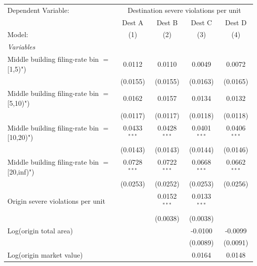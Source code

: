 \begingroup
\centering
\begin{tabular}{lcccc}
   \tabularnewline \midrule \midrule
   Dependent Variable: & \multicolumn{4}{c}{Destination severe violations per unit}\\
                                                  & Dest A         & Dest B         & Dest C         & Dest D \\   
   Model:                                         & (1)            & (2)            & (3)            & (4)\\  
   \midrule
   \emph{Variables}\\
   Middle building filing-rate bin $=$ [1,5)")    & 0.0112         & 0.0110         & 0.0049         & 0.0072\\   
                                                  & (0.0155)       & (0.0155)       & (0.0163)       & (0.0165)\\   
   Middle building filing-rate bin $=$ [5,10)")   & 0.0162         & 0.0157         & 0.0134         & 0.0132\\   
                                                  & (0.0117)       & (0.0117)       & (0.0118)       & (0.0118)\\   
   Middle building filing-rate bin $=$ [10,20)")  & 0.0433$^{***}$ & 0.0428$^{***}$ & 0.0401$^{***}$ & 0.0406$^{***}$\\   
                                                  & (0.0143)       & (0.0143)       & (0.0144)       & (0.0146)\\   
   Middle building filing-rate bin $=$ [20,inf)") & 0.0728$^{***}$ & 0.0722$^{***}$ & 0.0668$^{***}$ & 0.0662$^{***}$\\   
                                                  & (0.0253)       & (0.0252)       & (0.0253)       & (0.0256)\\   
   Origin severe violations per unit              &                & 0.0152$^{***}$ & 0.0133$^{***}$ &   \\   
                                                  &                & (0.0038)       & (0.0038)       &   \\   
   Log(origin total area)                         &                &                & -0.0100        & -0.0099\\   
                                                  &                &                & (0.0089)       & (0.0091)\\   
   Log(origin market value)                       &                &                & 0.0164         & 0.0148\\   

\end{tabular}

